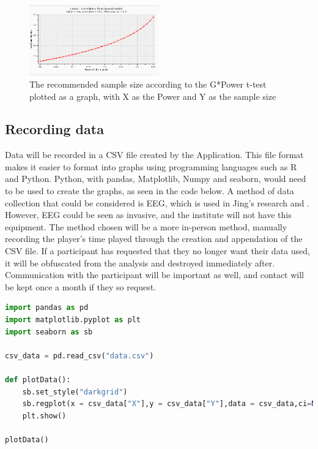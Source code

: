 \documentclass[conference]{IEEEtran}
\begin{document}
\begin{figure}[H]
\includegraphics[width = 0.5\textwidth]{fig2}
\caption{The recommended sample size according to the G*Power t-test plotted as a graph, with X as the Power and Y as the sample size}
\label{figure5}
\end{figure}

\subsection{Recording data}
Data will be recorded in a CSV file created by the Application. This file format makes it easier to format into graphs using programming languages such as R and Python. Python, with pandas, Matplotlib, Numpy and seaborn, would need to be used to create the graphs, as seen in the code below. A method of data collection that could be considered is EEG, which is used in Jing’s research \cite{Jing2024} and \cite{Ruqeyya2022}. However, EEG could be seen as invasive, and the institute will not have this equipment. The method chosen will be a more in-person method, manually recording the player’s time played through the creation and appendation of the CSV file. If a participant has requested that they no longer want their data used, it will be obfuscated from the analysis and destroyed immediately after. Communication with the participant will be important as well, and contact will be kept once a month if they so request.\\


%

\begin{lstlisting}[language=Python, caption=Python Script for generating Graphs,captionpos=b]
import pandas as pd
import matplotlib.pyplot as plt
import seaborn as sb

csv_data = pd.read_csv("data.csv")

def plotData():
    sb.set_style("darkgrid")
    sb.regplot(x = csv_data["X"],y = csv_data["Y"],data = csv_data,ci=None)
    plt.show()

plotData()
\end{lstlisting}
\end{document}
